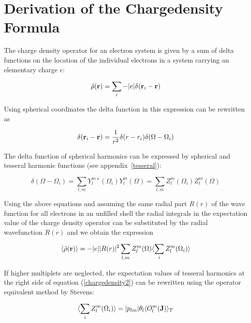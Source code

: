 \newpage
\section{Derivation of the Chargedensity Formula}\label{chargedensityoperator}
 
 The charge density operator for an electron system is given by a sum of delta
 functions on the location of the individual electrons in a system carrying
an elementary charge $e$:
 
 \begin{equation}
 \hat\rho(\mathbf r) = \sum_i -|e| \delta(\mathbf r_i - \mathbf r)
 \end{equation} 
 
 Using spherical coordinates the delta function in this expression can be rewritten as
 
 \begin{equation}
 \delta(\mathbf r_i - \mathbf r) = \frac{1}{r^2}\delta(r-r_i) \delta(\Omega- \Omega_i)
 \end{equation} 
 
 The delta function of spherical harmonics can be expressed by spherical and tesseral harmonic
 functions (see appendix~\ref{tesseral}):
 
 \begin{equation}
  \delta(\Omega- \Omega_i)= \sum_{l,m} Y_l^{m\star}(\Omega_i) Y_l^{m}(\Omega)= \sum_{l,m} Z_l^{m}(\Omega_i) Z_l^{m}(\Omega)
 \end{equation} 
 
 Using the above equations and assuming the same radial part $R(r)$ of the wave function for all electrons in an unfilled %
shell the radial integrals in the expectation value of the charge density operator can be substituted by the radial %
wavefunction $R(r)$ and we obtain the expression
 
  \begin{equation}\label{chargedensity2}
	       \langle \hat\rho(\mathbf r)\rangle=
	       -|e|  |R(r)|^2 \sum_{l,m}Z_l^{m}(\Omega) \langle\sum_i Z_l^{m}(\Omega_i)\rangle
   \end{equation} 

If higher multiplets are neglected, 
the expectation values of tesseral harmonics at the right side of equation (\ref{chargedensity2}) can
be rewritten using the operator equivalent method by Stevens\cite{hutchings64-227}:

  \begin{equation}
	      \langle\sum_i Z_l^{m}(\Omega_i)\rangle = |p_{lm}| \theta_{l} \langle O_l^m(\mathbf J)\rangle_T 
	      \end{equation} 

